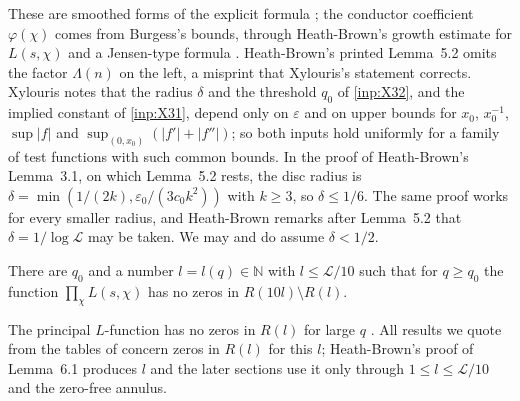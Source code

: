 \documentclass[11pt]{amsart}
\numberwithin{equation}{section}
\theoremstyle{plain}
\theoremstyle{definition}
\theoremstyle{remark}
\newcommand{\LL}{\mathcal{L}}
\newcommand{\NN}{\mathbb{N}}
\newcommand{\eps}{\varepsilon}
\newcommand{\1}{\mathbf{1}}
\begin{document}
These are smoothed forms of the explicit formula
\cite{Weil1952formules,Davenport2000multiplicative,MontgomeryVaughan2007multiplicative,IwaniecKowalski2004analytic};
the conductor coefficient $\varphi(\chi)$ comes from Burgess's bounds, through Heath-Brown's
growth estimate for $L(s,\chi)$ and a Jensen-type formula \cite[\S\S2--3]{HeathBrown1992zero}. Heath-Brown's printed Lemma~5.2 omits the factor $\Lambda(n)$ on
the left, a misprint that Xylouris's statement corrects. Xylouris notes \cite[p.~36]{Xylouris2011nullstellen}
that the radius $\delta$ and the threshold $q_0$ of \cref{inp:X32}, and the implied constant of
\cref{inp:X31}, depend only on $\eps$ and on upper bounds for $x_0$, $x_0^{-1}$, $\sup|f|$ and
$\sup_{(0,x_0)}(|f'|+|f''|)$; so both inputs hold uniformly for a family of test functions with
such common bounds. In the proof of Heath-Brown's Lemma~3.1, on which Lemma~5.2
rests, the disc radius is $\delta=\min(1/(2k),\eps_0/(3c_0k^2))$ with $k\ge3$, so $\delta\le1/6$.
The same proof works for every smaller radius, and Heath-Brown remarks after Lemma~5.2 that
$\delta=1/\log\LL$ may be taken. We may and do assume $\delta<1/2$.

\begin{inp}\label{inp:rectangle}
There are $q_0$ and a number $l=l(q)\in\NN$ with $l\le\LL/10$ such that for $q\ge q_0$ the function
$\prod_{\chi}L(s,\chi)$ has no zeros in $R(10l)\setminus R(l)$.
\end{inp}

The principal $L$-function has no zeros in $R(l)$ for large $q$ \cite[p.~21]{Xylouris2011nullstellen}.
All results we quote from the tables of \cite{HeathBrown1992zero,Xylouris2011nullstellen} concern zeros in
$R(l)$ for this $l$; Heath-Brown's proof of Lemma~6.1 produces $l$ and the later sections use it
only through $1\le l\le\LL/10$ and the zero-free annulus.
\end{document}

